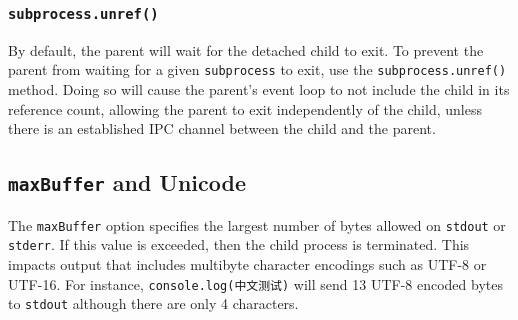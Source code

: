 \subsubsection{\texorpdfstring{\texttt{subprocess.unref()}}{subprocess.unref()}}\label{subprocess.unref}

By default, the parent will wait for the detached child to exit. To
prevent the parent from waiting for a given \texttt{subprocess} to exit,
use the \texttt{subprocess.unref()} method. Doing so will cause the
parent's event loop to not include the child in its reference count,
allowing the parent to exit independently of the child, unless there is
an established IPC channel between the child and the parent.

\begin{Shaded}
\begin{Highlighting}[]
\OperatorTok{=} \NormalTok{(}\NormalTok{)}\OperatorTok{;}

\OperatorTok{=} \NormalTok{(}\NormalTok{[}\NormalTok{]}\OperatorTok{,}\NormalTok{ [}\NormalTok{]}\OperatorTok{,}\NormalTok{ \{}
  \OperatorTok{:} \OperatorTok{,}
  \OperatorTok{:} \OperatorTok{,}
\NormalTok{\})}\OperatorTok{;}

\NormalTok{()}\OperatorTok{;}
\end{Highlighting}
\end{Shaded}

\subsection{\texorpdfstring{\texttt{maxBuffer} and
Unicode}{maxBuffer and Unicode}}\label{maxbuffer-and-unicode}

The \texttt{maxBuffer} option specifies the largest number of bytes
allowed on \texttt{stdout} or \texttt{stderr}. If this value is
exceeded, then the child process is terminated. This impacts output that
includes multibyte character encodings such as UTF-8 or UTF-16. For
instance,
\texttt{console.log(\textquotesingle{}中文测试\textquotesingle{})} will
send 13 UTF-8 encoded bytes to \texttt{stdout} although there are only 4
characters.

